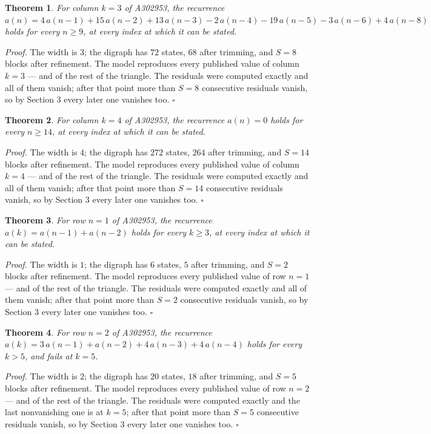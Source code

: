 \documentclass[11pt]{article}
\newtheorem{theorem}{Theorem}
\theoremstyle{definition}
\begin{document}
\begin{theorem} For column $k = 3$ of A302953, the recurrence $a(n) = 4\,a(n-1) + 15\,a(n-2) + 13\,a(n-3) - 2\,a(n-4) - 19\,a(n-5) - 3\,a(n-6) + 4\,a(n-8)$ holds for every $n \ge 9$, at every index at which it can be stated.\end{theorem}

{\itshape Proof.} The width is $3$; the digraph has $72$ states, $68$ after trimming, and $S = 8$ blocks after refinement. The model reproduces every published value of column $k = 3$ --- and of the rest of the triangle. The residuals were computed exactly and all of them vanish; after that point more than $S = 8$ consecutive residuals vanish, so by Section 3 every later one vanishes too. $\square$

\begin{theorem} For column $k = 4$ of A302953, the recurrence $a(n) = 0$ holds for every $n \ge 14$, at every index at which it can be stated.\end{theorem}

{\itshape Proof.} The width is $4$; the digraph has $272$ states, $264$ after trimming, and $S = 14$ blocks after refinement. The model reproduces every published value of column $k = 4$ --- and of the rest of the triangle. The residuals were computed exactly and all of them vanish; after that point more than $S = 14$ consecutive residuals vanish, so by Section 3 every later one vanishes too. $\square$

\begin{theorem} For row $n = 1$ of A302953, the recurrence $a(k) = a(n-1) + a(n-2)$ holds for every $k \ge 3$, at every index at which it can be stated.\end{theorem}

{\itshape Proof.} The width is $1$; the digraph has $6$ states, $5$ after trimming, and $S = 2$ blocks after refinement. The model reproduces every published value of row $n = 1$ --- and of the rest of the triangle. The residuals were computed exactly and all of them vanish; after that point more than $S = 2$ consecutive residuals vanish, so by Section 3 every later one vanishes too. $\square$

\begin{theorem} For row $n = 2$ of A302953, the recurrence $a(k) = 3\,a(n-1) + a(n-2) + 4\,a(n-3) + 4\,a(n-4)$ holds for every $k > 5$, and fails at $k = 5$.\end{theorem}

{\itshape Proof.} The width is $2$; the digraph has $20$ states, $18$ after trimming, and $S = 5$ blocks after refinement. The model reproduces every published value of row $n = 2$ --- and of the rest of the triangle. The residuals were computed exactly and the last nonvanishing one is at $k = 5$; after that point more than $S = 5$ consecutive residuals vanish, so by Section 3 every later one vanishes too. $\square$
\end{document}
